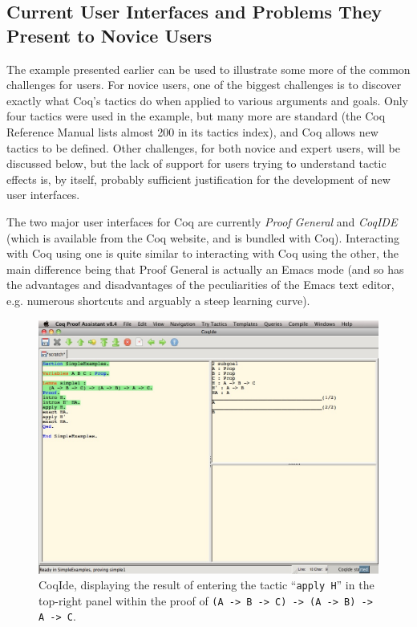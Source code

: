 \documentclass[11pt]{amsart}
\begin{document}
\subsection{Current User Interfaces and Problems They Present to Novice Users}

The example presented earlier can be used to illustrate some more of the common challenges for users.  For novice users, one of the biggest challenges is to discover exactly what Coq's tactics do when applied to various arguments and goals.   Only four tactics were used in the example, but many more are standard (the Coq Reference Manual\cite{Coq:manual} lists almost 200 in its tactics index), and Coq allows new tactics to be defined.  Other challenges, for both novice and expert users, will be discussed below, but the lack of support for users trying to understand tactic effects is, by itself, probably sufficient justification for the development of new user interfaces.

The two major user interfaces for Coq are currently \textit{Proof General}\cite{ProofGeneral,aspinall2000proof} and \textit{CoqIDE} (which is available from the Coq website\cite{Coq}, and is bundled with Coq).  Interacting with Coq using one is quite similar to interacting with Coq using the other, the main difference being that Proof General is actually an Emacs mode (and so has the advantages and disadvantages of the peculiarities of the Emacs text editor, e.g. numerous shortcuts and arguably a steep learning curve).

\begin{figure}
  \center
  \includegraphics[width=\linewidth]{simple1_1.jpg}
  \caption{CoqIde, displaying the result of entering the tactic ``\texttt{apply H}'' in the top-right panel within the proof of \texttt{(A -> B -> C) -> (A -> B) -> A -> C}.}
  \label{fig:simple1_1}
\end{figure}
\end{document}
